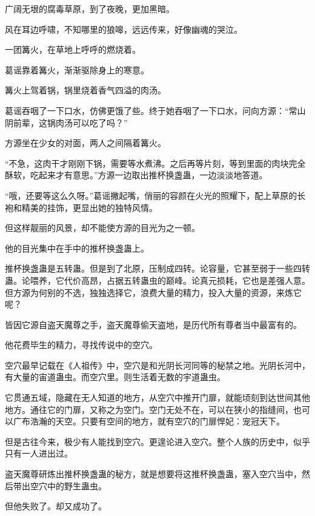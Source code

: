 
\begin{this_body}

广阔无垠的腐毒草原，到了夜晚，更加黑暗。

风在耳边呼啸，不知哪里的狼嗥，远远传来，好像幽魂的哭泣。

一团篝火，在草地上呼呼的燃烧着。

葛谣靠着篝火，渐渐驱除身上的寒意。

篝火上驾着锅，锅里烧着香气四溢的肉汤。

葛谣吞咽了一下口水，仿佛更饿了些。终于她吞咽了一下口水，问向方源：“常山阴前辈，这锅肉汤可以吃了吗？”

方源坐在少女的对面，两人之间隔着篝火。

“不急，这肉干才刚刚下锅，需要等水煮沸。之后再等片刻，等到里面的肉块完全酥软，吃起来才有意思。”方源一边取出推杯换盏蛊，一边淡淡地答道。

“哦，还要等这么久呀。”葛谣撇起嘴，俏丽的容颜在火光的照耀下，配上草原的长袍和精美的挂饰，更显出她的独特风情。

但这样靓丽的风景，却不能使方源的目光为之一顿。

他的目光集中在手中的推杯换盏蛊上。

推杯换盏蛊是五转蛊。但是到了北原，压制成四转。论容量，它甚至弱于一些四转蛊。论喂养，它代价高昂，占据五转蛊虫的巅峰。论真元损耗，它也是差强人意。但方源为何别的不选，独独选择它，浪费大量的精力，投入大量的资源，来炼它呢？

皆因它源自盗天魔尊之手，盗天魔尊偷天盗地，是历代所有尊者当中最富有的。

他花费毕生的精力，寻找传说中的空穴。

空穴最早记载在《人祖传》中，空穴是和光阴长河同等的秘禁之地。光阴长河中，有大量的宙道蛊虫。而空穴里。则生活着无数的宇道蛊虫。

它贯通五域，隐藏在无人知道的地方，从空穴中推开门扉，就能顷刻到达世间其他地方。通往它的门扉，又称之为空门。空门无处不在，可以在狭小的指缝间，也可以广布浩瀚的天空。只要有空间的地方，就有空穴的门扉悍妃：宠冠天下。

但是古往今来，极少有人能找到空穴。更遑论进入空穴。整个人族的历史中，似乎只有一人进出过。

盗天魔尊研炼出推杯换盏蛊的秘方，就是想要将这推杯换盏蛊，塞入空穴当中，然后带出空穴中的野生蛊虫。

但他失败了。却又成功了。


\end{this_body}
